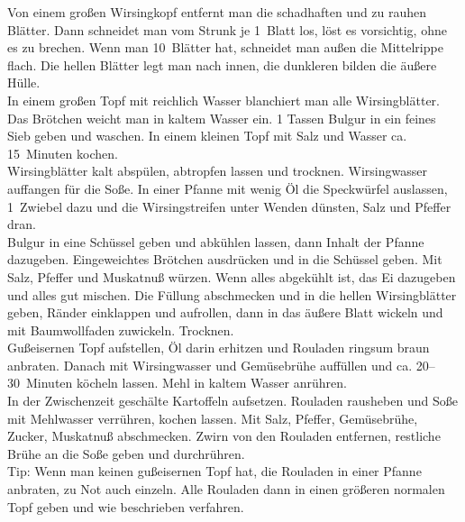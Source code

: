      \begin{zubereitung}
        Von einem großen Wirsingkopf entfernt man die schadhaften und zu rauhen
	Blätter. Dann schneidet man vom Strunk je 1~Blatt los, löst es
	vorsichtig, ohne es zu brechen. Wenn man 10~Blätter hat, schneidet man
	außen die Mittelrippe flach. Die hellen Blätter legt man nach innen,
	die dunkleren bilden die äußere Hülle. \\
	In einem großen Topf mit reichlich Wasser blanchiert man alle
	Wirsingblätter. Das Brötchen weicht man in kaltem Wasser ein. 1\breh{}
	Tassen Bulgur in ein feines Sieb geben und waschen. In einem kleinen
	Topf mit Salz und Wasser ca. 15~Minuten kochen. \\
	Wirsingblätter kalt abspülen, abtropfen lassen und trocknen.
	Wirsingwasser auffangen für die Soße. In einer Pfanne mit wenig Öl die
	Speckwürfel auslassen, 1~Zwiebel dazu und die Wirsingstreifen unter
	Wenden dünsten, Salz und Pfeffer dran. \\
	Bulgur in eine Schüssel geben und abkühlen lassen, dann Inhalt der
	Pfanne dazugeben. Eingeweichtes Brötchen ausdrücken und in die Schüssel
	geben. Mit Salz, Pfeffer und Muskatnuß würzen. Wenn alles abgekühlt
	ist, das Ei dazugeben und alles gut mischen. Die Füllung abschmecken
	und in die hellen Wirsingblätter geben, Ränder einklappen und
	aufrollen, dann in das äußere Blatt wickeln und mit Baumwollfaden
	zuwickeln. Trocknen. \\
	Gußeisernen Topf aufstellen, Öl darin erhitzen und Rouladen ringsum
	braun anbraten. Danach mit Wirsingwasser und Gemüsebrühe auffüllen und
	ca. 20--30~Minuten köcheln lassen. Mehl in kaltem Wasser anrühren. \\
	In der Zwischenzeit geschälte Kartoffeln aufsetzen. Rouladen rausheben
	und Soße mit Mehlwasser verrühren, kochen lassen. Mit Salz, Pfeffer,
	Gemüsebrühe, Zucker, Muskatnuß abschmecken. Zwirn von den Rouladen
	entfernen, restliche Brühe an die Soße geben und durchrühren. \\
	Tip: Wenn man keinen gußeisernen Topf hat, die Rouladen in einer Pfanne
	anbraten, zu Not auch einzeln. Alle Rouladen dann in einen größeren
	normalen Topf geben und wie beschrieben verfahren. \\
      \end{zubereitung}



